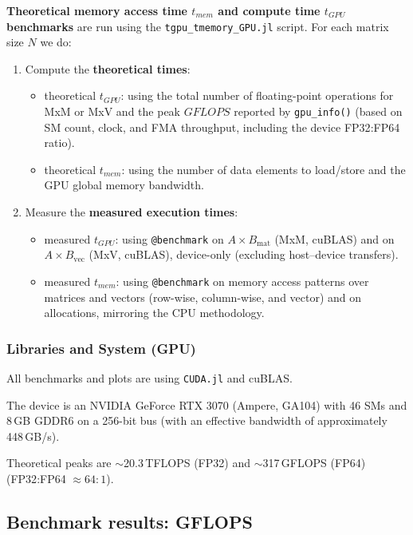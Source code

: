 \textbf{Theoretical memory access time $t_{mem}$ and compute time $t_{GPU}$ benchmarks} are run using the \texttt{tgpu\_tmemory\_GPU.jl} script. For each matrix size $N$ we do:
\begin{enumerate}
    \item Compute the \textbf{theoretical times}:
    \begin{itemize}
        \item theoretical $t_{GPU}$: using the total number of floating-point operations for MxM or MxV and the peak $GFLOPS$ reported by \texttt{gpu\_info()} (based on SM count, clock, and FMA throughput, including the device FP32{:}FP64 ratio).
        \item theoretical $t_{mem}$: using the number of data elements to load/store and the GPU global memory bandwidth.
    \end{itemize}
    \item Measure the \textbf{measured execution times}:
    \begin{itemize}
        \item measured $t_{GPU}$: using \texttt{@benchmark} on $A \times B_{\text{mat}}$ (MxM, cuBLAS) and on $A \times B_{\text{vec}}$ (MxV, cuBLAS), device-only (excluding host–device transfers).
        \item measured $t_{mem}$: using \texttt{@benchmark} on memory access patterns over matrices and vectors (row-wise, column-wise, and vector) and on allocations, mirroring the CPU methodology.
    \end{itemize}
\end{enumerate}

\vspace{1em}

\subsubsection*{Libraries and System (GPU)}

All benchmarks and plots are using \texttt{CUDA.jl} and cuBLAS. 

The device is an NVIDIA GeForce RTX 3070 (Ampere, GA104) with 46 SMs and 8\,GB GDDR6 on a 256-bit bus (with an effective bandwidth of approximately 448\,GB/s).

Theoretical peaks are $\sim$20.3\,TFLOPS (FP32) and $\sim$317\,GFLOPS (FP64) (FP32{:}FP64 $\approx 64{:}1$).

\clearpage

\subsection{Benchmark results: GFLOPS}
\label{sec:gpu_bench_results_GFLOPS}

